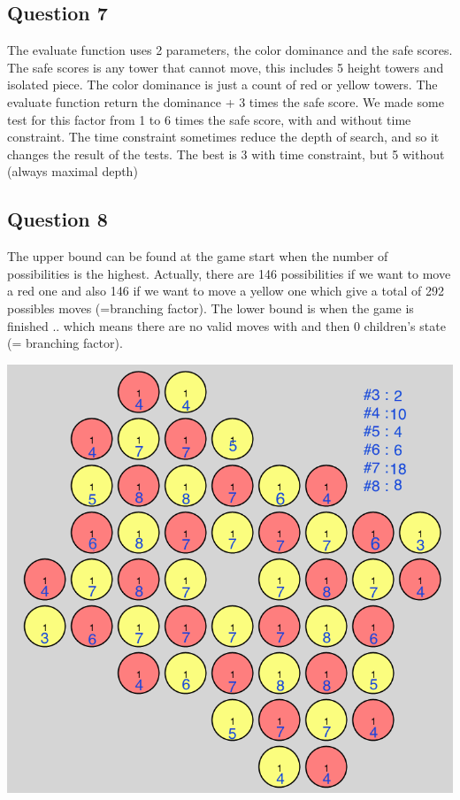\documentclass[10pt]{report}
\begin{document}
\subsection*{Question 7}
The evaluate function uses 2 parameters, the color dominance and the safe scores. The safe scores is any tower that cannot move, this includes 5 height towers and isolated piece. The color dominance is just a count of red or yellow towers. The evaluate function return the dominance + 3 times the safe score. We made some test for this factor from 1 to 6 times the safe score, with and without time constraint. The time constraint sometimes reduce the depth of search, and so it changes the result of the tests. The best is 3 with time constraint, but 5 without (always maximal depth)

\subsection*{Question 8}
The upper bound can be found at the game start when the number of possibilities is the highest. Actually, there are 146 possibilities if we want to move a red one and also 146 if we want to move a yellow one which give a total of 292 possibles moves (=branching factor). The lower bound is when the game is finished .. which means there are no valid moves with and then 0 children's state (= branching factor).

\begin{center}
\includegraphics[scale=0.4]{branching.png}
\end{center}
\end{document}
